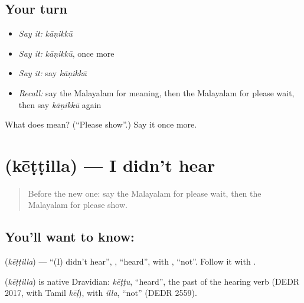 \subsection*{Your turn}
\begin{itemize}
\raggedright
  \item \emph{Say it:} \emph{kāṇikkū}
  \item \emph{Say it:} \emph{kāṇikkū}, once more
  \item \emph{Say it:} say \emph{kāṇikkū}
  \item \emph{Recall:} say the Malayalam for meaning, then the Malayalam for please wait, then say \emph{kāṇikkū} again
\end{itemize}

\begin{tcolorbox}[breakable,colback=teal!4,colframe=teal!35!black,title={Before you move on}]
What does  mean? (\textquotedblleft{}Please show\textquotedblright{}.) Say it once more.
\end{tcolorbox}
\section[\texorpdfstring{\ml{കേട്ടില്ല} (kēṭṭilla)}{കേട്ടില്ല (kēṭṭilla)}]{ (kēṭṭilla) — I didn't hear}

\label{lesson:ML-C120-didnthear}



\begin{quote}
Before the new one: say the Malayalam for please wait, then the Malayalam for please show.
\end{quote}

\subsection*{You'll want to know: }
\textbf{} (\emph{kēṭṭilla}) — \textquotedblleft{}(I) didn't hear\textquotedblright{}, \textbf{}, \textquotedblleft{}heard\textquotedblright{}, with \textbf{}, \textquotedblleft{}not\textquotedblright{}. Follow it with \textbf{ }.

\begin{cousinweb}
\textbf{} (\emph{kēṭṭilla}) is native Dravidian: \emph{kēṭṭu}, \textquotedblleft{}heard\textquotedblright{}, the past of the hearing verb (DEDR 2017, with Tamil \emph{kēḷ}), with \emph{illa}, \textquotedblleft{}not\textquotedblright{} (DEDR 2559).
\end{cousinweb}

